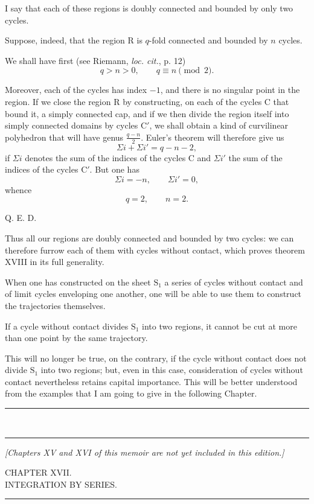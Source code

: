 \documentclass[11pt]{article}
\newcommand{\ornament}{\begin{center}\rule{2.5em}{0.4pt}\,\raisebox{0.1ex}{\tiny$\bullet\bullet\bullet$}\,\rule{2.5em}{0.4pt}\end{center}}
\newcommand{\shortline}{\begin{center}\rule{3.5em}{0.4pt}\end{center}}
\begin{document}
I say that each of these regions is doubly connected and bounded by only two cycles.

Suppose, indeed, that the region R is $q$-fold connected and bounded by $n$ cycles.

We shall have first (see Riemann, \emph{loc. cit.}, p. 12)
\[
q>n>0,\qquad q\equiv n\pmod{2}.
\]

Moreover, each of the cycles has index $-1$, and there is no singular point in the region. If we close the region R by constructing, on each of the cycles C that bound it, a simply connected cap, and if we then divide the region itself into simply connected domains by cycles C$'$, we shall obtain a kind of curvilinear polyhedron that will have genus $\frac{q-n}{2}$. Euler’s theorem will therefore give us
\[
\Sigma i+\Sigma i'=q-n-2,
\]
if $\Sigma i$ denotes the sum of the indices of the cycles C and $\Sigma i'$ the sum of the indices of the cycles C$'$. But one has
\[
\Sigma i=-n,
\qquad
\Sigma i'=0,
\]
whence
\[
q=2,
\qquad
n=2.
\]
\begin{flushright}Q. E. D.\end{flushright}

Thus all our regions are doubly connected and bounded by two cycles: we can therefore furrow each of them with cycles without contact, which proves theorem XVIII in its full generality.

When one has constructed on the sheet $\mathrm{S}_1$ a series of cycles without contact and of limit cycles enveloping one another, one will be able to use them to construct the trajectories themselves.

If a cycle without contact divides $\mathrm{S}_1$ into two regions, it cannot be cut at more than one point by the same trajectory.

This will no longer be true, on the contrary, if the cycle without contact does not divide $\mathrm{S}_1$ into two regions; but, even in this case, consideration of cycles without contact nevertheless retains capital importance. This will be better understood from the examples that I am going to give in the following Chapter.

\ornament

\begin{center}\itshape [Chapters XV and XVI of this memoir are not yet included in this edition.]\end{center}

\clearpage
\begin{center}
{\Large CHAPTER XVII.}\\[0.6em]
{\large INTEGRATION BY SERIES.}
\end{center}
\shortline
\end{document}
